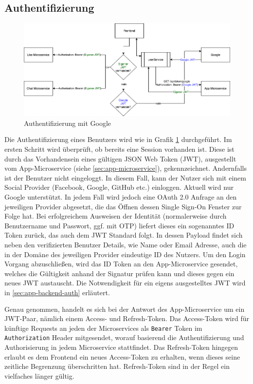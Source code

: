 \documentclass{article}
\begin{document}
\subsection{Authentifizierung}
\label{sec:frontend-auth}

\begin{figure}[H]
\centering
\label{fig:loginFlow}
\includegraphics[width=\textwidth]{images/loginFlow}
\caption{Authentifizierung mit Google}
\end{figure}

Die Authentifizierung eines Benutzers wird wie in Grafik \ref{fig:loginFlow} durchgeführt. Im ersten Schritt wird überprüft, ob bereits eine Session vorhanden ist. Diese ist durch das Vorhandensein eines gültigen JSON Web Token (JWT), ausgestellt vom
App-Microservice (siehe \autoref{sec:app-microservice}), gekennzeichnet. Andernfalls ist der Benutzer nicht eingeloggt. In diesem Fall, kann der Nutzer sich mit einem Social Provider (Facebook, Google, GitHub etc.) einloggen. Aktuell wird nur Google unterstützt. In jedem Fall wird jedoch eine OAuth 2.0 Anfrage an den jeweiligen Provider abgesetzt, die das Öffnen dessen Single Sign-On Fenster zur Folge hat. Bei erfolgreichem Ausweisen der Identität (normalerweise durch Benutzername und Passwort, ggf. mit OTP) liefert dieses ein sogenanntes ID Token zurück, das auch dem JWT Standard folgt. In dessen Payload findet sich neben den verifizierten Benutzer Details, wie Name oder Email Adresse, auch die in der Domäne des jeweiligen Provider eindeutige ID des Nutzers. Um den Login Vorgang abzuschließen, wird das ID Token an den App-Microservice gesendet, welches die Gültigkeit anhand der Signatur prüfen kann und dieses gegen ein neues JWT austauscht. Die Notwendigkeit für ein eigens ausgestelltes JWT wird in \autoref{sec:app-backend-auth} erläutert.

Genau genommen, handelt es sich bei der Antwort des App-Microservice um ein JWT-Paar, nämlich einem Access- und Refresh-Token. Das Access-Token wird für künftige Requests an jeden der Microservices als \texttt{Bearer} Token im \texttt{Authorization} Header mitgesendet, worauf basierend die Authentifizierung und Authorisierung in jedem Microservice stattfindet. Das Refresh-Token hingegen erlaubt es dem Frontend ein neues Access-Token zu erhalten, wenn dieses seine zeitliche Begrenzung überschritten hat. Refresh-Token sind in der Regel ein vielfaches länger gültig.
\end{document}
